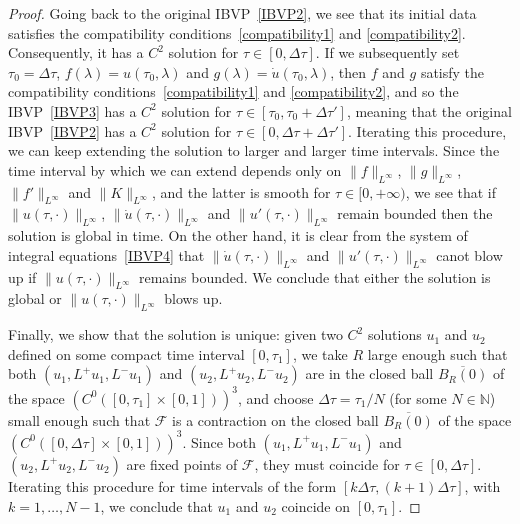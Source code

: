 \documentclass[10pt,a4paper]{amsart}
\newcommand{\bbN}{\mathbb{N}}      %
\newcommand{\cF}{\mathcal{F}}
\begin{document}
\begin{proof}
Going back to the original IBVP~\eqref{IBVP2}, we see that its initial data satisfies the compatibility conditions~\eqref{compatibility1} and \eqref{compatibility2}. Consequently, it has a $C^2$ solution for $\tau \in [0, \Delta \tau]$. If we subsequently set $\tau_0 = \Delta \tau$, $f(\lambda)=u(\tau_0,\lambda)$ and $g(\lambda)=\dot{u}(\tau_0,\lambda)$, then $f$ and $g$ satisfy the compatibility conditions~\eqref{compatibility1} and \eqref{compatibility2}, and so the IBVP~\eqref{IBVP3} has a $C^2$ solution for $\tau \in [\tau_0, \tau_0 + \Delta \tau']$, meaning that the original IBVP~\eqref{IBVP2} has a $C^2$ solution for $\tau \in [0, \Delta \tau + \Delta \tau']$. Iterating this procedure, we can keep extending the solution to larger and larger time intervals. Since the time interval by which we can extend depends only on $\| f \|_{L^\infty}$, $\| g \|_{L^\infty}$, $\| f' \|_{L^\infty}$ and $\| K \|_{L^\infty}$, and the latter is smooth for $\tau \in [0, +\infty)$, we see that if $\| u(\tau, \cdot) \|_{L^\infty}$, $\| \dot{u}(\tau, \cdot) \|_{L^\infty}$ and $\| u'(\tau, \cdot) \|_{L^\infty}$ remain bounded then the solution is global in time. On the other hand, it is clear from the system of integral equations~\eqref{IBVP4} that $\| \dot{u}(\tau, \cdot) \|_{L^\infty}$ and $\| u'(\tau, \cdot) \|_{L^\infty}$ canot blow up if $\| u(\tau, \cdot) \|_{L^\infty}$ remains bounded. We conclude that either the solution is global or $\| u(\tau, \cdot) \|_{L^\infty}$ blows up.

Finally, we show that the solution is unique: given two $C^2$ solutions $u_1$ and $u_2$ defined on some compact time interval $[0, \tau_1]$, we take $R$ large enough such that both $(u_1,L^+{u}_1,L^-u_1)$ and $(u_2,L^+u_2,L^-u_2)$ are in the closed ball $\overline{B_R(0)}$ of the space $\left(C^0\left([0, \tau_1] \times [0,1]\right)\right)^3$, and choose $\Delta \tau = \tau_1 / N$ (for some $N \in \bbN$) small enough such that $\cF$ is a contraction on the closed ball $\overline{B_R(0)}$ of the space $\left(C^0\left([0,\Delta \tau] \times [0,1]\right)\right)^3$. Since both $(u_1,L^+{u}_1,L^-u_1)$ and $(u_2,L^+u_2,L^-u_2)$ are fixed points of $\cF$, they must coincide for $\tau \in [0,\Delta \tau]$. Iterating this procedure for time intervals of the form $[ k \Delta \tau, (k + 1) \Delta\tau]$, with $k = 1, \ldots, N-1$, we conclude that $u_1$ and $u_2$ coincide on $[0, \tau_1]$. 
\end{proof}
\end{document}
